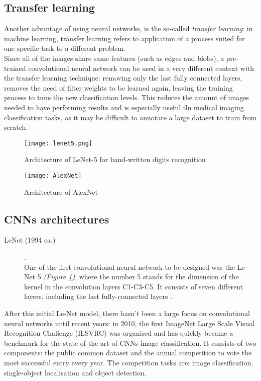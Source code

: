\documentclass[../main.tex]{subfiles}
\begin{document}
\vspace{5mm}
\subsection{Transfer learning}
Another advantage of using neural networks, is the so-called \textit{transfer learning}: in machine learning, transfer learning refers to application of a process suited for one specific task to a different problem. \cite{Lakhani2018} \\ Since all of the images share same features (such as edges and blobs), a pre-trained convolutional neural network can be used in a very different context with the transfer learning technique: removing only the last fully connected layers, removes the need of filter weights to be learned again, leaving the training process to tune the new classification levels. This reduces the amount of images needed to have performing results and is especially useful iIn medical imaging classification tasks, as it may be difficult to annotate a large dataset to train from scratch. \cite{Lakhani2018} 


\begin{figure}[!b]
  \centering
  \texttt{[image: lenet5.png]}
  \caption{Architecture of LeNet-5 for hand-written digits recognition \cite{LeCun1998}}
  \label{fig:lenet5}
\end{figure}

\begin{figure}[!b]
  \centering
  \texttt{[image: AlexNet]}
  \caption{Architecture of AlexNet \cite{Krizhevsky2012}}
  \label{fig:alexnet}
\end{figure}

\vspace{5mm}
\subsection{CNNs architectures}
\begin{description}
\item[LeNet (1994 ca.)] \cite{LeCun1998}. \hfill \\
One of the first convolutional neural network to be designed was the Le-Net 5 \textit{(Figure \ref{fig:lenet5})}, where the number 5 stands for the dimension of the kernel in the convolution layers C1-C3-C5. It consists of seven different layers, including the last fully-connected layers \cite{LeCun1998}. 
\end{description}
After this initial Le-Net model, there hasn't been a large focus on convolutional neural networks until recent years: in 2010, the first ImageNet Large Scale Visual Recognition Challenge (ILSVRC) was organised \cite{Russakovsky} and has quickly became a benchmark for the state of the art of CNNs image classification. It consists of two components: the public common dataset and the annual competition to vote the most successful entry every year. The competition tasks are: image classification, single-object localisation and object detection. \cite{Russakovsky}
\end{document}
